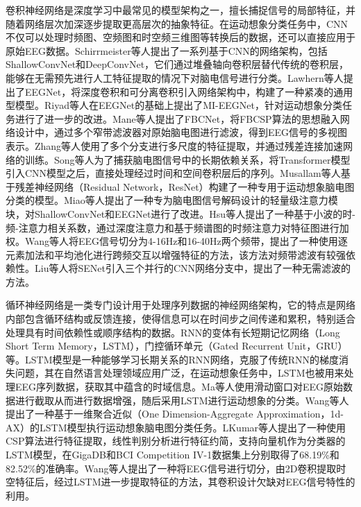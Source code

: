 卷积神经网络是深度学习中最常见的模型架构之一，擅长捕捉信号的局部特征，并随着网络层次加深逐步提取更高层次的抽象特征。在运动想象分类任务中，CNN不仅可以处理时频图、空频图和时空频三维图等转换后的数据，还可以直接应用于原始EEG数据。Schirrmeister等人\cite{schirrmeister2017deep}提出了一系列基于CNN的网络架构，包括ShallowConvNet和DeepConvNet，它们通过堆叠轴向卷积层替代传统的卷积层，能够在无需预先进行人工特征提取的情况下对脑电信号进行分类。Lawhern等人\cite{lawhern2018eegnet}提出了EEGNet，将深度卷积和可分离卷积引入网络架构中，构建了一种紧凑的通用型模型。Riyad等人\cite{riyad2021mi}在EEGNet的基础上提出了MI-EEGNet，针对运动想象分类任务进行了进一步的改进。Mane等人\cite{mane2021fbcnet}提出了FBCNet，将FBCSP算法的思想融入网络设计中，通过多个窄带滤波器对原始脑电图进行滤波，得到EEG信号的多视图表示。Zhang等人\cite{zhang2021eeg}使用了多个分支进行多尺度的特征提取，并通过残差连接加速网络的训练。Song等人\cite{song2022eeg}为了捕获脑电图信号中的长期依赖关系，将Transformer\cite{vaswani2017attention}模型引入CNN模型之后，直接处理经过时间和空间卷积层后的序列。Musallam等人\cite{musallam2021electroencephalography}基于残差神经网络（Residual Network，ResNet）\cite{he2016deep}构建了一种专用于运动想象脑电图分类的模型。Miao等人\cite{miao2023lmda}提出了一种专为脑电图信号解码设计的轻量级注意力模块，对ShallowConvNet和EEGNet进行了改进。Hsu等人\cite{10065454}提出了一种基于小波的时-频-注意力相关系数，通过深度注意力和基于频谱图的时频注意力对特征图进行加权。Wang等人\cite{wang2023ifnet}将EEG信号切分为4-16Hz和16-40Hz两个频带，提出了一种使用逐元素加法和平均池化进行跨频交互以增强特征的方法，该方法对频带滤波有较强依赖性。Liu等人\cite{liu2023compact}将SENet引入三个并行的CNN网络分支中，提出了一种无需滤波的方法。

循环神经网络是一类专门设计用于处理序列数据的神经网络架构，它的特点是网络内部包含循环结构或反馈连接，使得信息可以在时间步之间传递和累积，特别适合处理具有时间依赖性或顺序结构的数据。RNN的变体有长短期记忆网络（Long Short Term Memory，LSTM），门控循环单元（Gated Recurrent Unit，GRU）等。LSTM模型是一种能够学习长期关系的RNN网络，克服了传统RNN的梯度消失问题，其在自然语言处理领域应用广泛，在运动想象任务中，LSTM也被用来处理EEG序列数据，获取其中蕴含的时域信息。Ma等人\cite{ma2018improving}使用滑动窗口对EEG原始数据进行截取从而进行数据增强，随后采用LSTM进行运动想象的分类。Wang等人\cite{wang2018lstm}提出了一种基于一维聚合近似（One Dimension-Aggregate Approximation，1d-AX）的LSTM模型执行运动想象脑电图分类任务。LKumar等人\cite{kumar2019brain}提出了一种使用CSP算法进行特征提取，线性判别分析进行特征约简，支持向量机作为分类器的LSTM模型，在GigaDB\cite{cho2017eeg}和BCI Competition IV-1\cite{blankertz2007non}数据集上分别取得了68.19\%和82.52\%的准确率。Wang等人\cite{wang20232d}提出了一种将EEG信号进行切分，由2D卷积提取时空特征后，经过LSTM进一步提取特征的方法，其卷积设计欠缺对EEG信号特性的利用。

